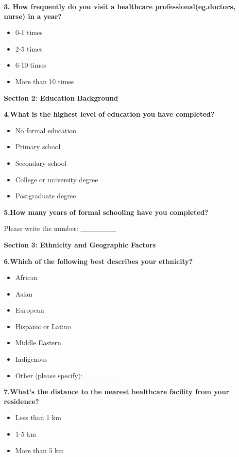 \documentclass[
  letterpaper,
  DIV=11,
  numbers=noendperiod]{scrartcl}
\providecommand{\tightlist}{%
  \setlength{\itemsep}{0pt}\setlength{\parskip}{0pt}}\usepackage{longtable,booktabs,array}
\begin{document}
\textbf{3. How frequently do you visit a healthcare
professional(eg.doctors, nurse) in a year?}

\begin{itemize}
\tightlist
\item
  0-1 times
\item
  2-5 times
\item
  6-10 times
\item
  More than 10 times
\end{itemize}

\textbf{Section 2: Education Background}

\textbf{4.What is the highest level of education you have completed?}

\begin{itemize}
\tightlist
\item
  No formal education
\item
  Primary school
\item
  Secondary school
\item
  College or university degree
\item
  Postgraduate degree
\end{itemize}

\textbf{5.How many years of formal schooling have you completed?}

Please write the number: \_\_\_\_\_\_\_

\textbf{Section 3: Ethnicity and Geographic Factors}

\textbf{6.Which of the following best describes your ethnicity?}

\begin{itemize}
\tightlist
\item
  African
\item
  Asian
\item
  European
\item
  Hispanic or Latino
\item
  Middle Eastern
\item
  Indigenous
\item
  Other (please specify): \_\_\_\_\_\_\_
\end{itemize}

\textbf{7.What's the distance to the nearest healthcare facility from
your residence?}

\begin{itemize}
\tightlist
\item
  Less than 1 km
\item
  1-5 km
\item
  More than 5 km
\end{itemize}
\end{document}
